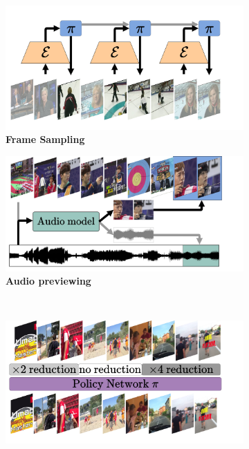 \documentclass[smallextended,twocolumn,natbib]{svjour3}
\begin{document}
\begin{figure}[t]
     \centering
     \begin{subfigure}[b]{0.49\linewidth}
         \centering
         \includegraphics[width=\linewidth]{figs/redundancies_reduction/redudancies_sample.pdf}
         \caption{\textbf{Frame Sampling}}
         \label{fig:redundancies_reduction::sampling}
     \end{subfigure}
     \hfill
     \begin{subfigure}[b]{0.49\linewidth}
         \centering
         \includegraphics[width=\linewidth]{figs/redundancies_reduction/redudancies_preview.pdf}
         \caption{\textbf{Audio previewing}}
         \label{fig:redundancies_reduction::preview}
     \end{subfigure}
     \\
     \begin{subfigure}[b]{0.49\linewidth}
         \centering
         \includegraphics[width=\linewidth]{figs/redundancies_reduction/redudancies_permute.pdf}

\end{subfigure}
\end{figure}
\end{document}
